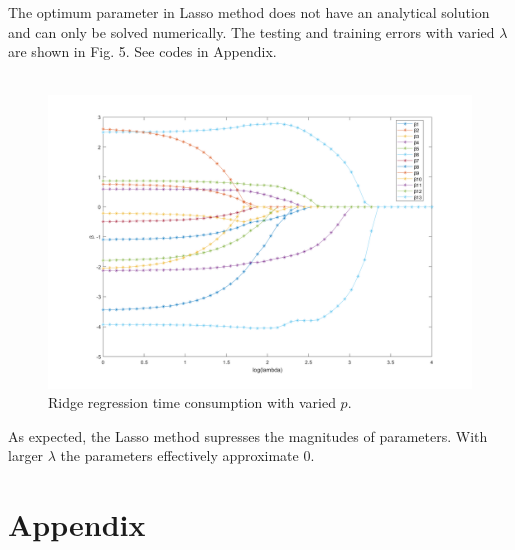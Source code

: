 \documentclass[11pt]{article}
\begin{document}
\begin{enumerate}
The optimum parameter in Lasso method does not have an analytical solution and can only be solved numerically. The testing and training errors with varied $\lambda$ are shown in Fig. 5. See codes in Appendix.
\\ \\
\begin{figure}[h] %
\centering\includegraphics[width=0.75\linewidth]{prob4_5.png}
\caption{Ridge regression time consumption with varied $p$.} %
\label{fig:prob4_5}  %
\end{figure}

As expected, the Lasso method supresses the magnitudes of parameters. With larger $\lambda$ the parameters effectively approximate 0.

\end{enumerate}

\section*{Appendix}
\end{document}
